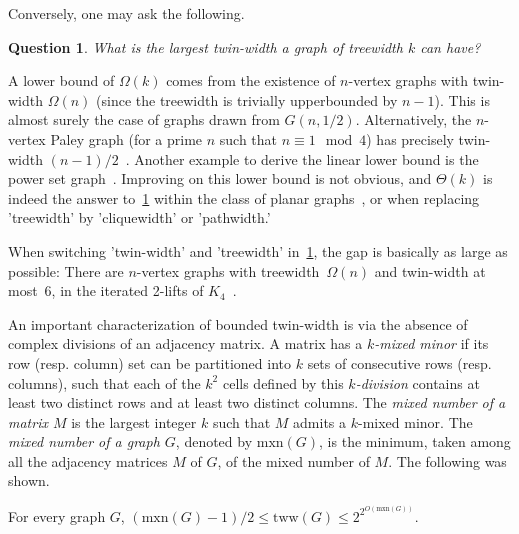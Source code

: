 \documentclass[a4paper,UKenglish,cleveref,hyperref,autoref]{lipics-v2021}
\newtheorem{question}{Question}%
\newcommand{\tww}{\text{tww}}
\newcommand{\mxn}{\text{mxn}}
\begin{document}
Conversely, one may ask the following.
\begin{question}\label{q:tw}
  What is the largest twin-width a graph of treewidth $k$ can have? 
\end{question}
A lower bound of $\Omega(k)$ comes from the existence of $n$-vertex graphs with twin-width $\Omega(n)$ (since the treewidth is trivially upperbounded by $n-1$).
This is almost surely the case of graphs drawn from $G(n,1/2)$.
Alternatively, the $n$-vertex Paley graph (for a prime $n$ such that $n \equiv 1 \mod 4$) has precisely twin-width $(n-1)/2$~\cite{Ahn22}.
Another example to derive the linear lower bound is the power set graph~\cite{Jacob22}.
Improving on this lower bound is not obvious, and $\Theta(k)$ is indeed the answer to~\cref{q:tw} within the class of planar graphs~\cite{Jacob22}, or when replacing 'treewidth' by 'cliquewidth' or 'pathwidth.'

When switching 'twin-width' and 'treewidth' in~\cref{q:tw}, the gap is basically as large as possible:
There are $n$-vertex graphs with treewidth~$\Omega(n)$ and twin-width at most~6, in the iterated 2-lifts of $K_4$~\cite{twin-width2,Bilu06}.

An important characterization of bounded twin-width is via the absence of complex divisions of an adjacency matrix.
A matrix has a \emph{$k$-mixed minor} if its row (resp. column) set can be partitioned into $k$ sets of consecutive rows (resp. columns), such that each of the $k^2$ cells defined by this \emph{$k$-division} contains at least two distinct rows and at least two distinct columns.
The \emph{mixed number of a matrix $M$} is the largest integer $k$ such that $M$ admits a $k$-mixed minor. 
The \emph{mixed number of a graph $G$}, denoted by $\mxn(G)$, is the minimum, taken among all the adjacency matrices $M$ of $G$, of the mixed number of $M$.
The following was shown.
\begin{theorem}\label{thm:mxn}
For every graph $G$, $(\mxn(G) - 1)/2 \leqslant \tww(G) \leqslant 2^{2^{O(\mxn(G))}}$.
\end{theorem}
\end{document}

